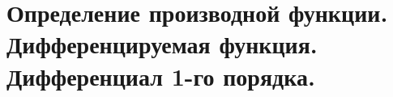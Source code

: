 \section{Определение производной функции. Дифференцируемая функция. Дифференциал 1-го порядка.}

\pagebreak